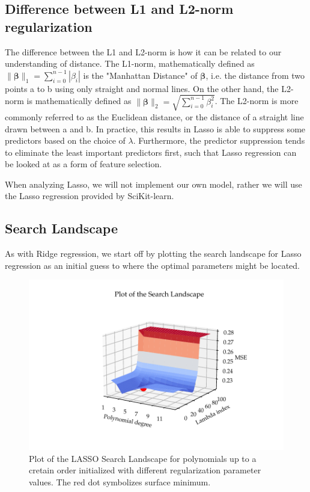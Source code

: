 \documentclass[11pt, a4paper]{article}
\begin{document}
\subsection*{Difference between L1 and L2-norm regularization}
The difference between the L1 and L2-norm is how it can be related to our understanding of distance. The L1-norm, mathematically defined as $\lVert \bm{\beta} \rVert_1 = \sum_{i=0}^{n-1}|\beta_i|$ is the "Manhattan Distance" of $\bm{\beta}$, i.e. the distance from two points a to b using only straight and normal lines. On the other hand, the L2-norm is mathematically defined as $\lVert \bm{\beta} \rVert_2 = \sqrt{\sum_{i=0}^{n-1}\beta_i^2}$. The L2-norm is more commonly referred to as the Euclidean distance, or the distance of a straight line drawn between a and b. In practice, this results in Lasso is able to suppress some predictors based on the choice of $\lambda$. Furthermore, the predictor suppression tends to eliminate the least important predictors first, such that Lasso regression can be looked at as a form of feature selection. \cite{Geron2019}

When analyzing Lasso, we will not implement our own model, rather we will use the Lasso regression provided by SciKit-learn.

\subsection*{Search Landscape}
As with Ridge regression, we start off by plotting the search landscape for Lasso regression as an initial guess to where the optimal parameters might be located. 

\begin{figure}
  \centering
  \hspace*{-3.8cm}
  \includegraphics[scale=1.5]{figures/EX5_search_landscape_lasso.pdf}
  \caption{\label{fig:lasso_search_land}Plot of the LASSO Search Landscape for polynomials up to a cretain order initialized with different regularization parameter values. The red dot symbolizes surface minimum.}
\end{figure}
\end{document}
